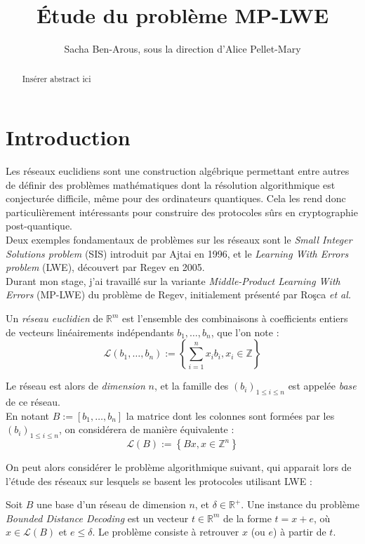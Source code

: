 \documentclass[11pt,a4paper]{article}
\title{\textbf{Étude du problème MP-LWE}}
\date{}
\author{Sacha Ben-Arous, sous la direction d'Alice Pellet-Mary}
\begin{document}
\maketitle 
\begin{abstract}
Insérer abstract ici \\
\end{abstract}
\tableofcontents
\newpage
\section{Introduction}
\; Les réseaux euclidiens sont une construction algébrique permettant entre autres de définir des problèmes mathématiques dont la résolution algorithmique est conjecturée difficile, même pour des ordinateurs quantiques. Cela les rend donc particulièrement intéressants pour construire des protocoles sûrs en cryptographie post-quantique. \\
Deux exemples fondamentaux de problèmes sur les réseaux sont le \textit{Small Integer Solutions problem} (SIS) introduit par Ajtai en 1996, et le \textit{Learning With Errors problem} (LWE), découvert par Regev en 2005. \\
Durant mon stage, j'ai travaillé sur la variante \textit{Middle-Product Learning With Errors} (MP-LWE) du problème de Regev, initialement présenté par Roşca \textit{et al.} \cite{mplwe}
\\

\begin{defin} 
Un \textit{réseau euclidien} de $\mathbb{R}^m$ est l'ensemble des combinaisons à coefficients entiers de vecteurs linéairements indépendants $b_1, \dots, b_n$, que l'on note :
\[\mathcal{L}(b_1,\dots,b_n) := \left\{ \sum_{i=1}^n x_ib_i, x_i \in \mathbb{Z} \right\} \]

Le réseau est alors de \textit{dimension} $n$, et la famille des $(b_i)_{1\leq i \leq n}$ est appelée \textit{base} de ce réseau. \\

En notant $B:=[b_1,\dots,b_n]$ la matrice dont les colonnes sont formées par les $(b_i)_{1\leq i \leq n}$, on considérera de manière équivalente : \[\mathcal{L}(B) := \left\{ Bx, x \in \mathbb{Z}^n \right\} \]
\end{defin}

On peut alors considérer le problème algorithmique suivant, qui apparait lors de l'étude des réseaux sur lesquels se basent les protocoles utilisant LWE : 

\begin{defin} 
Soit $B$ une base d'un réseau de dimension $n$, et $\delta \in \mathbb{R}^+$. Une instance du problème \textit{Bounded Distance Decoding} est un vecteur $t \in \mathbb{R}^m$ de la forme $t=x+e$, où $x\in \mathcal{L}(B)$ et $e \leq \delta$. Le problème consiste à retrouver $x$ (ou $e$) à partir de $t$.
\end{defin}
\end{document}

